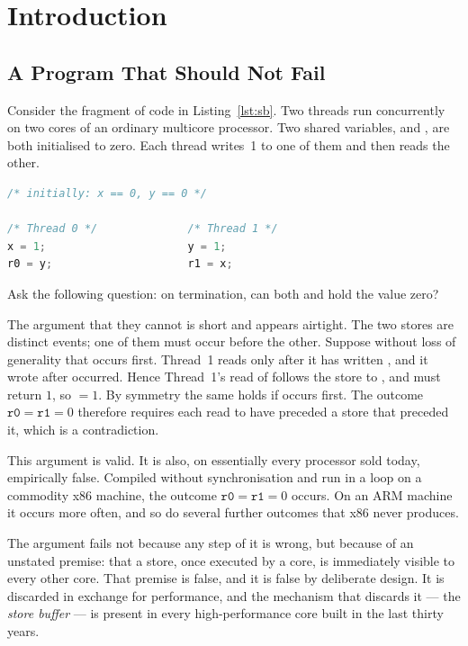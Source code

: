 \chapter{Introduction}
\label{ch:intro}

\section{A Program That Should Not Fail}
\label{sec:motivating}

Consider the fragment of code in Listing~\ref{lst:sb}.
Two threads run
concurrently on two cores of an ordinary multicore processor.
Two shared
variables,  and , are both initialised to zero.
Each thread
writes~1 to one of them and then reads the other.

\begin{lstlisting}[language=C,caption={The store-buffer idiom. Both threads write one shared variable and then read the other.},label={lst:sb}]
/* initially: x == 0, y == 0 */

/* Thread 0 */              /* Thread 1 */
x = 1;                      y = 1;
r0 = y;                     r1 = x;
\end{lstlisting}

Ask the following question: on termination, can both  and 
hold the value zero?

The argument that they cannot is short and appears airtight.
The two stores are
distinct events; one of them must occur before the other.
Suppose without loss
of generality that  occurs first.
Thread~1 reads  only after
it has written , and it wrote  after  occurred.
Hence Thread~1's read of  follows the store to , and must return
$1$, so  $= 1$. By symmetry the same holds if  occurs first.
The outcome $\texttt{r0} = \texttt{r1} = 0$ therefore requires each read to have
preceded a store that preceded it, which is a contradiction.

This argument is valid.
It is also, on essentially every processor sold today,
empirically false.
Compiled without synchronisation and run in a loop on a
commodity x86 machine, the outcome $\texttt{r0} = \texttt{r1} = 0$ occurs.
On an
ARM machine it occurs more often, and so do several further outcomes that x86
never produces.

The argument fails not because any step of it is wrong, but because of an
unstated premise: that a store, once executed by a core, is immediately visible
to every other core.
That premise is false, and it is false by deliberate design.
It is discarded in exchange for performance, and the mechanism that discards it
--- the \emph{store buffer} --- is present in every high-performance core built in
the last thirty years.

